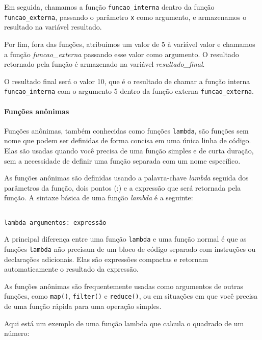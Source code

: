 \documentclass[a4paper, 12pt, onecolumn,singlespacing]{article}
\begin{document}
Em seguida, chamamos a função \texttt{funcao\_interna} dentro da função \texttt{funcao\_externa}, passando o parâmetro \texttt{x} como argumento, e armazenamos o resultado na variável resultado.

Por fim, fora das funções, atribuímos um valor de 5 à variável valor e chamamos a função \textit{funcao\_externa} passando esse valor como argumento. O resultado retornado pela função é armazenado na variável \textit{resultado\_final}.

O resultado final será o valor 10, que é o resultado de chamar a função interna \texttt{funcao\_interna} com o argumento 5 dentro da função externa \texttt{funcao\_externa}.

	\paragraph{Funções anônimas}
	\label{python_funcoes_anonimas}
	Funções anônimas, também conhecidas como funções \texttt{lambda}, são funções sem nome que podem ser definidas de forma concisa em uma única linha de código. Elas são usadas quando você precisa de uma função simples e de curta duração, sem a necessidade de definir uma função separada com um nome específico.
	
	As funções anônimas são definidas usando a palavra-chave \textit{lambda} seguida dos parâmetros da função, dois pontos (:) e a expressão que será retornada pela função. A sintaxe básica de uma função \textit{lambda} é a seguinte:
	
	\begin{verbatim}

lambda argumentos: expressão

	\end{verbatim}

A principal diferença entre uma função \texttt{lambda} e uma função normal é que as funções \texttt{lambda} não precisam de um bloco de código separado com instruções ou declarações adicionais. Elas são expressões compactas e retornam automaticamente o resultado da expressão.

As funções anônimas são frequentemente usadas como argumentos de outras funções, como \texttt{map()}, \texttt{filter()} e \texttt{reduce()}, ou em situações em que você precisa de uma função rápida para uma operação simples.

Aqui está um exemplo de uma função lambda que calcula o quadrado de um número:
\end{document}

